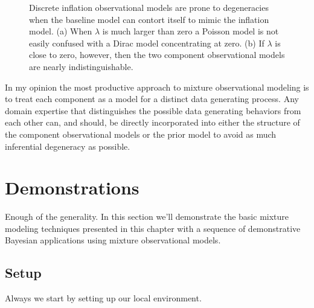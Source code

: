 \documentclass[
  letterpaper,
  DIV=11,
  numbers=noendperiod]{scrartcl}
\begin{document}
\begin{figure}
\begin{minipage}{0.45\linewidth}
{}

\subcaption{\label{fig-zip_degen-overlapping}}

\end{minipage}%

\caption{\label{fig-zip_degen}Discrete inflation observational models
are prone to degeneracies when the baseline model can contort itself to
mimic the inflation model. (a) When \(\lambda\) is much larger than zero
a Poisson model is not easily confused with a Dirac model concentrating
at zero. (b) If \(\lambda\) is close to zero, however, then the two
component observational models are nearly indistinguishable.}

\end{figure}%

In my opinion the most productive approach to mixture observational
modeling is to treat each component as a model for a distinct data
generating process. Any domain expertise that distinguishes the possible
data generating behaviors from each other can, and should, be directly
incorporated into either the structure of the component observational
models or the prior model to avoid as much inferential degeneracy as
possible.

\section{Demonstrations}\label{demonstrations}

Enough of the generality. In this section we'll demonstrate the basic
mixture modeling techniques presented in this chapter with a sequence of
demonstrative Bayesian applications using mixture observational models.

\subsection{Setup}\label{setup}

Always we start by setting up our local environment.
\end{document}
